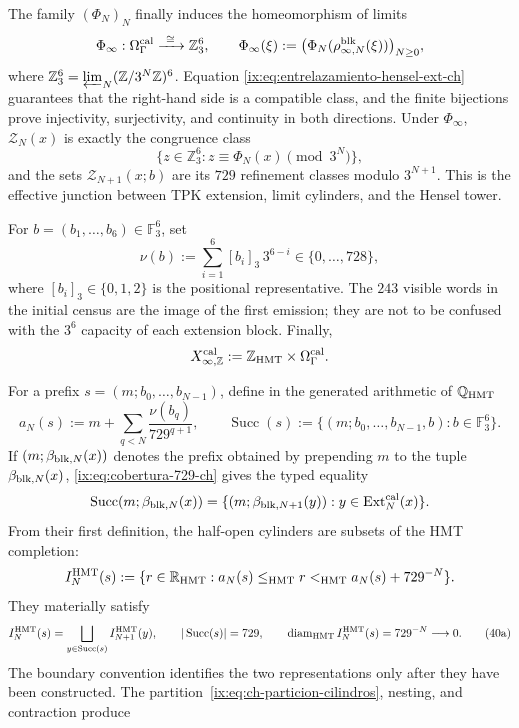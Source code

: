 The family \((\Phi_N)_N\) finally induces the homeomorphism of limits
\begin{equation}
 \Phi_\infty:\Omega_\Gamma^{\rm cal}
 \xrightarrow{\ \cong\ }\mathbb Z_3^6,\qquad
 \Phi_\infty(\xi):=
 \bigl(\Phi_N(\rho^{\rm blk}_{\infty,N}(\xi))\bigr)_{N\ge0},
 \label{ix:eq:phi-infinito-hensel-ext-ch}
\end{equation}
where
\(\mathbb Z_3^6=\varprojlim_N(\mathbb Z/3^N\mathbb Z)^6\).
Equation \eqref{ix:eq:entrelazamiento-hensel-ext-ch} guarantees that the
right-hand side is a compatible class, and the finite bijections prove
injectivity, surjectivity, and continuity in both directions. Under
\(\Phi_\infty\), \(\mathscr Z_N(x)\) is exactly the congruence class
\[
 \{z\in\mathbb Z_3^6:z\equiv\Phi_N(x)\pmod{3^N}\},
\]
and the sets \(\mathscr Z_{N+1}(x;b)\) are its \(729\) refinement classes
modulo \(3^{N+1}\). This is the effective junction between TPK extension,
limit cylinders, and the Hensel tower.

For \(b=(b_1,\ldots,b_6)\in\mathbb F_3^6\), set
\[
 \nu(b):=\sum_{i=1}^{6}[b_i]_3\,3^{6-i}
 \in\{0,\ldots,728\},
\tag{40c$_0$}
\label{ix:eq:valor-bloque-ch}
\]
where \([b_i]_3\in\{0,1,2\}\) is the positional representative. The
\(243\) visible words in the initial census are the image of the first
emission; they are not to be confused with the \(3^6\) capacity of each
extension block. Finally,
\[
 X_{\infty,\mathbb Z}^{\rm cal}
 :=\mathbb Z_{\rm HMT}\times\Omega_\Gamma^{\rm cal}.
\]



For a prefix \(s=(m;b_0,\ldots,b_{N-1})\), define in the generated arithmetic
of \(\mathbb Q_{\rm HMT}\)
\[
 a_N(s):=m+\sum_{q<N}\frac{\nu(b_q)}{729^{q+1}},
 \qquad
 \operatorname{Succ}(s):=
 \{(m;b_0,\ldots,b_{N-1},b):b\in\mathbb F_3^6\}.
\]
If \((m;\beta_{{\rm blk},N}(x))\) denotes the prefix obtained by prepending
\(m\) to the tuple \(\beta_{{\rm blk},N}(x)\),
\eqref{ix:eq:cobertura-729-ch} gives the typed equality
\[
 \operatorname{Succ}(m;\beta_{{\rm blk},N}(x))
 =\{(m;\beta_{{\rm blk},N+1}(y)):
       y\in\operatorname{Ext}^{\rm cal}_N(x)\}.
\]
From their first definition, the half-open cylinders are subsets of the HMT
completion:
\[
 I_N^{\rm HMT}(s):=
 \{r\in\mathbb R_{\rm HMT}:
      a_N(s)\le_{\rm HMT}r<_{\rm HMT}a_N(s)+729^{-N}\}.
\]
They materially satisfy
\[
 I_N^{\rm HMT}(s)=
 \bigsqcup_{y\in\operatorname{Succ}(s)}I_{N+1}^{\rm HMT}(y),
 \qquad |\operatorname{Succ}(s)|=729,
 \qquad \operatorname{diam}_{\rm HMT}I_N^{\rm HMT}(s)
      =729^{-N}\longrightarrow0.
\tag{40a}\label{ix:eq:ch-particion-cilindros}
\]
The boundary convention identifies the two representations only after they
have been constructed. The partition~\eqref{ix:eq:ch-particion-cilindros},
nesting, and contraction produce

